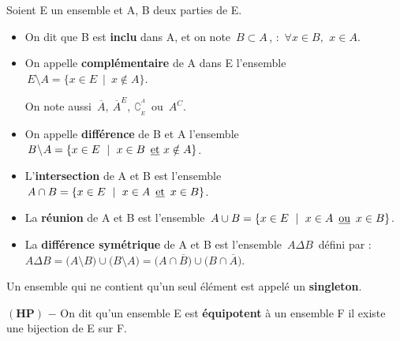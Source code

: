 \vspace{0.9cm}

Soient E un ensemble et A, B deux parties de E.
\begin{itemize}[leftmargin=1cm,label=•]
	\item On dit que B est \textbf{inclu} dans A, et on note $\,B\subset A\,$, \ssi : \(\,\forall x\in B,\ \, x\in A\).
	
	\item On appelle \textbf{complémentaire} de A dans E l'ensemble \(\,E\!\setminus\!A=\{x\in E \ \mid \ x\notin A\}\).\vspace{0.1cm}\\
	\begin{small} On note aussi \(\displaystyle\,\overline{A},\ \overline{A}^E,\ \complement_{_E}^{^A}\,\) ou \(\,A^C\).\end{small}
	
	\item On appelle \textbf{différence} de B et A l'ensemble \(\,B\!\setminus\!A = \{x\in E \ \mid \ x\in B \, \text{ \underline{et} } x\notin A\}\). 
	
	\item L'\textbf{intersection} de A et B est l'ensemble \(\,A\cap B=\{x\in E \ \mid \ x\in A\, \text{ \underline{et} }\, x\in B\}\).
	
	\item La \textbf{réunion} de A et B est l'ensemble \(\,A\cup B=\{x\in E \ \mid \ x\in A \, \text{ \underline{ou} } \, x\in B\}\).
	
	\item La \textbf{différence symétrique} de A et B est l'ensemble \(\,A\Delta B\,\) défini par :\vspace{0.1cm}\\
    \(A\Delta B=\bigl(A\!\setminus\! B\bigr)\cup \bigl(B\!\setminus\!A\bigr)=\bigl(A\cap \overline{B}\bigr)\cup\bigl(B\cap \overline{A}\bigr)\).

\end{itemize}

\vspace{1cm}

Un ensemble qui ne contient qu'un seul élément est appelé un \textbf{singleton}.

\vspace{1cm}

\(\left(\mathbf{H}\mathbf{P}\right)\) $-$ On dit qu'un ensemble E est \textbf{équipotent} à un ensemble F \ssi il existe une bijection de E sur F.

